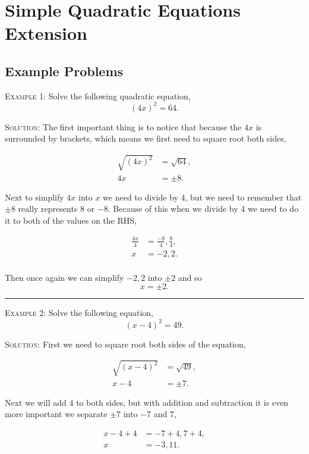 \documentclass[a4paper,12pt]{article}
\begin{document}
\large
\section*{Simple Quadratic Equations Extension}

\subsection*{Example Problems}

\textsc{Example 1}: Solve the following quadratic equation,
$$(4x)^2 = 64.$$

\textsc{Solution}: The first important thing is to notice that 
because the $4x$ is surrounded by brackets, which means 
we first need to square root both sides,

\begin{align*}
    \sqrt{(4x)^2} &= \sqrt{64}, \\
    4x &= \pm 8.
\end{align*}

Next to simplify $4x$ into $x$ we need to divide by 4, but
we need to remember that $\pm 8$ really represents 8 or $-8$.
Because of this when we divide by 4 we need to do it to both 
of the values on the RHS,

\begin{align*}
    \frac{4x}{4} &= \frac{-8}{4},\frac{8}{4}, \\
    x &= -2, 2. \\
\end{align*}

Then once again we can simplify $-2, 2$ into $\pm 2$
and so
$$x = \pm 2.$$

\vspace{3mm}
\hrule
\vspace{3mm}

\textsc{Example 2}: Solve the following equation,
$$(x - 4)^2 = 49.$$

\textsc{Solution}: First we need to square root both 
sides of the equation,

\begin{align*}
\sqrt{(x - 4)^2} &= \sqrt{49}, \\
x - 4 &= \pm 7.
\end{align*}

Next we will add 4 to both sides, but with addition and 
subtraction it is even more important we separate $\pm 7$ 
into $-7$ and $7$,

\begin{align*}
x - 4 + 4 &= -7 + 4, 7 + 4, \\
x &= -3, 11.
\end{align*}
\end{document}
